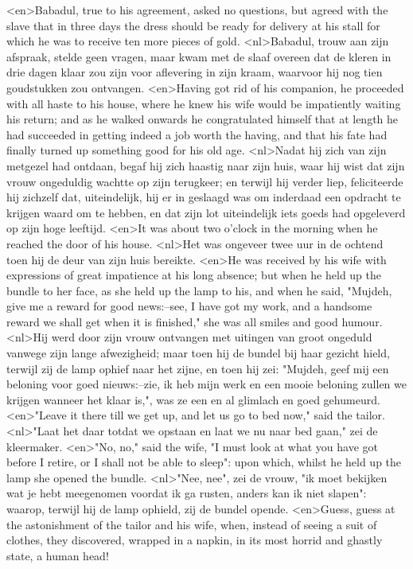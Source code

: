 <en>Babadul, true to his agreement, asked no questions, but agreed with the slave that in three days the dress should be ready for delivery at his stall for which he was to receive ten more pieces of gold.
<nl>Babadul,  trouw aan zijn afspraak, stelde geen vragen, maar kwam met de slaaf overeen dat de kleren in drie dagen klaar zou zijn voor aflevering in zijn kraam, waarvoor hij nog tien goudstukken zou ontvangen.
<en>Having got rid of his companion, he proceeded with all haste to his house, where he knew his wife would be impatiently waiting his return; and as he walked onwards he congratulated himself that at length he had succeeded in getting indeed a job worth the having, and that his fate had finally turned up something good for his old age.
<nl>Nadat hij zich van zijn metgezel had ontdaan, begaf hij zich haastig naar zijn huis, waar hij wist dat zijn vrouw ongeduldig  wachtte op zijn terugkeer; en terwijl hij verder liep, feliciteerde hij zichzelf dat,  uiteindelijk, hij er in geslaagd was om inderdaad een opdracht te krijgen waard  om te hebben, en dat zijn lot uiteindelijk iets goeds had opgeleverd op zijn hoge leeftijd.
<en>It was about two o'clock in the morning when he reached the door of his house.
<nl>Het was ongeveer twee uur in de ochtend toen hij de deur van zijn huis bereikte.
<en>He was received by his wife with expressions of great impatience at his long absence; but when he held up the bundle to her face, as she held up the lamp to his, and when he said, "Mujdeh, give me a reward for good news:--see, I have got my work, and a handsome reward we shall get when it is finished," she was all smiles and good humour.
<nl>Hij werd door zijn vrouw ontvangen met uitingen van groot ongeduld vanwege zijn lange afwezigheid; maar toen hij de bundel bij haar gezicht hield, terwijl zij de lamp  ophief naar het zijne, en toen hij zei: "Mujdeh, geef mij een beloning voor goed nieuws:--zie, ik heb mijn werk en een mooie beloning zullen we krijgen wanneer het klaar is,", was ze een en al glimlach en  goed gehumeurd.
<en>"Leave it there till we get up, and let us go to bed now," said the tailor.
<nl>"Laat het daar totdat we opstaan en laat we nu naar bed gaan," zei de kleermaker.
<en>"No, no," said the wife, "I must look at what you have got before I retire, or I shall not be able to sleep": upon which, whilst he held up the lamp she opened the bundle.
<nl>"Nee, nee", zei de vrouw, "ik moet bekijken wat je hebt meegenomen voordat ik ga rusten, anders kan ik niet slapen": waarop, terwijl hij de lamp ophield, zij de bundel opende.
<en>Guess, guess at the astonishment of the tailor and his wife, when, instead of seeing a suit of clothes, they discovered, wrapped in a napkin, in its most horrid and ghastly state, a human head!
